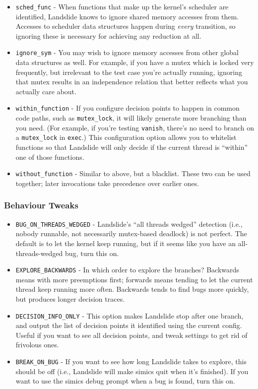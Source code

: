 \documentclass{article}
\begin{document}
\begin{itemize}
	\item \texttt{sched\_func} - When functions that make up the kernel's scheduler are identified, Landslide knows to ignore shared memory accesses from them. Accesses to scheduler data structures happen during {\em every} transition, so ignoring these is necessary for achieving any reduction at all.
	\item \texttt{ignore\_sym} - You may wish to ignore memory accesses from other global data structures as well. For example, if you have a mutex which is locked very frequently, but irrelevant to the test case you're actually running, ignoring that mutex results in an independence relation that better reflects what you actually care about.
	\item \texttt{within\_function} - If you configure decision points to happen in common code paths, such as \texttt{mutex\_lock}, it will likely generate more branching than you need. (For example, if you're testing \texttt{vanish}, there's no need to branch on a \texttt{mutex\_lock} in \texttt{exec}.) This configuration option allows you to whitelist functions so that Landslide will only decide if the current thread is ``within'' one of those functions.
	\item \texttt{without\_function} - Similar to above, but a blacklist. These two can be used together; later invocations take precedence over earlier ones.
\end{itemize}

\subsubsection{Behaviour Tweaks}
\begin{itemize}
	\item \texttt{BUG\_ON\_THREADS\_WEDGED} - Landslide's ``all threads wedged'' detection (i.e., nobody runnable, not necessarily mutex-based deadlock) is not perfect. The default is to let the kernel keep running, but if it seems like you have an all-threads-wedged bug, turn this on.
	\item \texttt{EXPLORE\_BACKWARDS} - In which order to explore the branches? Backwards means with more preemptions first; forwards means tending to let the current thread keep running more often. Backwards tends to find bugs more quickly, but produces longer decision traces.
	\item \texttt{DECISION\_INFO\_ONLY} - This option makes Landslide stop after one branch, and output the list of decision points it identified using the current config. Useful if you want to see all decision points, and tweak settings to get rid of frivolous ones.
	\item \texttt{BREAK\_ON\_BUG} - If you want to see how long Landslide takes to explore, this should be off (i.e., Landslide will make simics quit when it's finished). If you want to use the simics debug prompt when a bug is found, turn this on.
\end{itemize}
\end{document}
